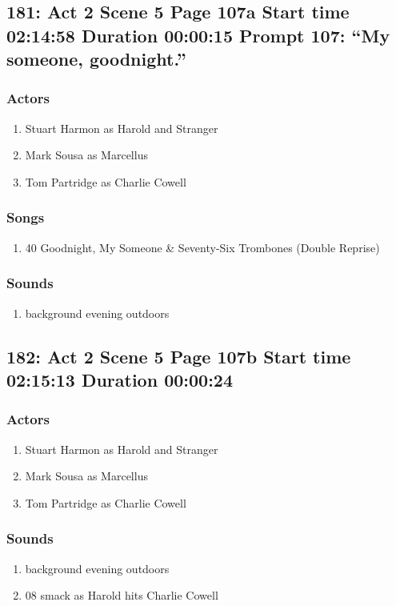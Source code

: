 \subsection{181: Act 2 Scene 5 Page 107a Start time 02:14:58 Duration 00:00:15 Prompt 107: ``My someone, goodnight.''}

\subsubsection{Actors}
\begin{enumerate}
\item Stuart Harmon as Harold and Stranger
\item Mark Sousa as Marcellus
\item Tom Partridge as Charlie Cowell
\end{enumerate}

\subsubsection{Songs}
\begin{enumerate}
\item 40 Goodnight, My Someone \& Seventy-Six Trombones (Double Reprise)
\end{enumerate}\subsubsection{Sounds}
\begin{enumerate}
\item background evening outdoors
\end{enumerate}
\subsection{182: Act 2 Scene 5 Page 107b Start time 02:15:13 Duration 00:00:24}

\subsubsection{Actors}
\begin{enumerate}
\item Stuart Harmon as Harold and Stranger
\item Mark Sousa as Marcellus
\item Tom Partridge as Charlie Cowell
\end{enumerate}

\subsubsection{Sounds}
\begin{enumerate}
\item background evening outdoors
\item 08 smack as Harold hits Charlie Cowell
\end{enumerate}
